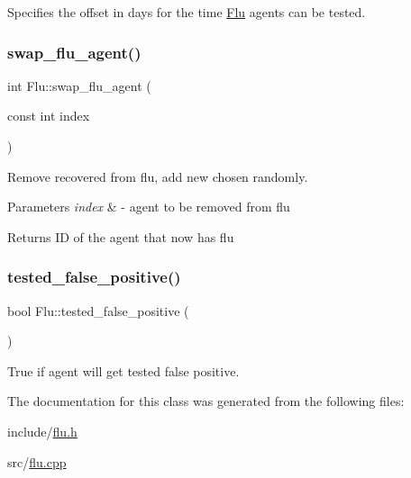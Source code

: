 Specifies the offset in days for the time \hyperlink{classFlu}{Flu} agents can be tested. 

\mbox{\label{classFlu_a98293f770a941b92441d0db70fd97fb6}} 
\subsubsection{\texorpdfstring{swap\+\_\+flu\+\_\+agent()}{swap\_flu\_agent()}}
{\footnotesize\ttfamily int Flu\+::swap\+\_\+flu\+\_\+agent (\begin{DoxyParamCaption}\item[{const int}]{index }\end{DoxyParamCaption})}



Remove recovered from flu, add new chosen randomly. 


\begin{DoxyParams}{Parameters}
{\em index} & -\/ agent to be removed from flu \\
\hline
\end{DoxyParams}
\begin{DoxyReturn}{Returns}
ID of the agent that now has flu 
\end{DoxyReturn}
\mbox{\label{classFlu_ad5a3f4a140a364c4367063ba919af7b1}} 
\subsubsection{\texorpdfstring{tested\+\_\+false\+\_\+positive()}{tested\_false\_positive()}}
{\footnotesize\ttfamily bool Flu\+::tested\+\_\+false\+\_\+positive (\begin{DoxyParamCaption}{ }\end{DoxyParamCaption})\hspace{0.3cm}{\ttfamily [inline]}}



True if agent will get tested false positive. 



The documentation for this class was generated from the following files\+:\begin{DoxyCompactItemize}
\item 
include/\hyperlink{flu_8h}{flu.\+h}\item 
src/\hyperlink{flu_8cpp}{flu.\+cpp}\end{DoxyCompactItemize}
